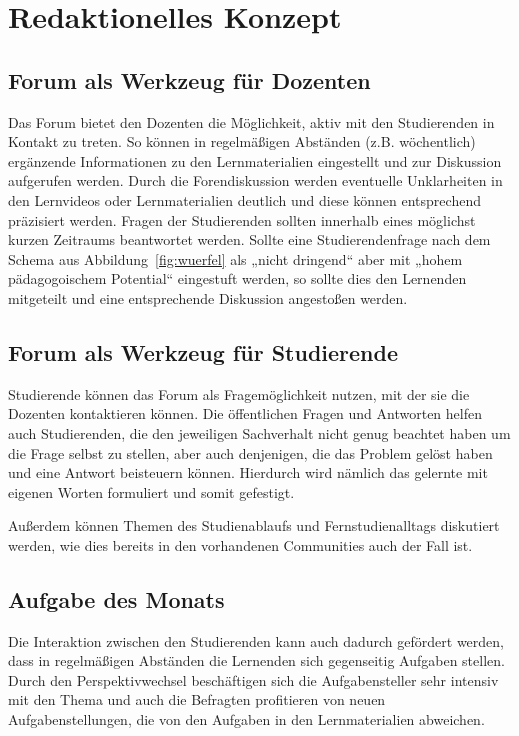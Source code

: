

\section{Redaktionelles Konzept} %
\label{sec:redaktionelles_konzept}
\subsection{Forum als Werkzeug für Dozenten} %
\label{sub:forum_als_werkzeug_fur_dozenten}
Das Forum bietet den Dozenten die Möglichkeit, aktiv mit den Studierenden in Kontakt zu treten. So können in regelmäßigen Abständen (z.B. wöchentlich) ergänzende Informationen zu den Lernmaterialien eingestellt und zur Diskussion aufgerufen werden. Durch die Forendiskussion werden eventuelle Unklarheiten in den Lernvideos oder Lernmaterialien deutlich und diese können entsprechend präzisiert werden. Fragen der Studierenden sollten innerhalb eines möglichst kurzen Zeitraums beantwortet werden. Sollte eine Studierendenfrage nach dem Schema aus Abbildung~\ref{fig:wuerfel} als „nicht dringend“ aber mit „hohem pädagogoischem Potential“ eingestuft werden, so sollte dies den Lernenden mitgeteilt und eine entsprechende Diskussion angestoßen werden.

\subsection{Forum als Werkzeug für Studierende} %
\label{sub:forum_als_werkzeug_fur_studierende}
Studierende können das Forum als Fragemöglichkeit nutzen, mit der sie die Dozenten kontaktieren können. Die öffentlichen Fragen und Antworten helfen auch Studierenden, die den jeweiligen Sachverhalt nicht genug beachtet haben um die Frage selbst zu stellen, aber auch denjenigen, die das Problem gelöst haben und eine Antwort beisteuern können. Hierdurch wird nämlich das gelernte mit eigenen Worten formuliert und somit gefestigt.

Außerdem können Themen des Studienablaufs und Fernstudienalltags diskutiert werden, wie dies bereits in den vorhandenen Communities auch der Fall ist.

\subsection{Aufgabe des Monats} %
\label{sub:aufgabe_des_monats}
Die Interaktion zwischen den Studierenden kann auch dadurch gefördert werden, dass in regelmäßigen Abständen die Lernenden sich gegenseitig Aufgaben stellen. Durch den Perspektivwechsel beschäftigen sich die Aufgabensteller sehr intensiv mit den Thema und auch die Befragten profitieren von neuen Aufgabenstellungen, die von den Aufgaben in den Lernmaterialien abweichen.

